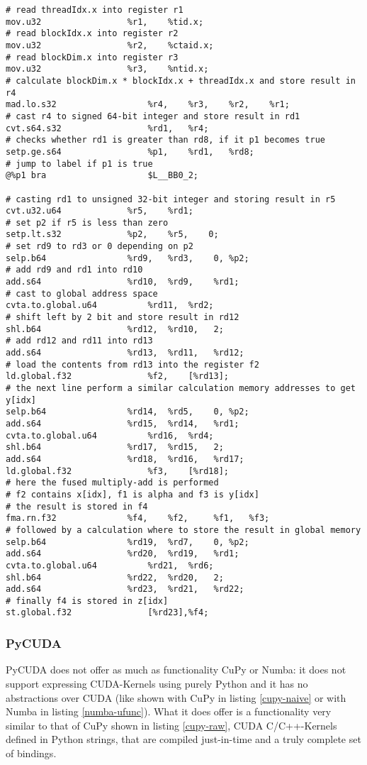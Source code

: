 \documentclass[english,11pt,a4paper,table]{article} %
\begin{document}
\begin{verbatim}
# read threadIdx.x into register r1
mov.u32					%r1, 	%tid.x;
# read blockIdx.x into register r2
mov.u32 				%r2, 	%ctaid.x;
# read blockDim.x into register r3
mov.u32					%r3, 	%ntid.x;
# calculate blockDim.x * blockIdx.x + threadIdx.x and store result in r4
mad.lo.s32     				%r4, 	%r3, 	%r2, 	%r1;
# cast r4 to signed 64-bit integer and store result in rd1
cvt.s64.s32     			%rd1, 	%r4;
# checks whether rd1 is greater than rd8, if it p1 becomes true
setp.ge.s64     			%p1, 	%rd1, 	%rd8;
# jump to label if p1 is true
@%p1 bra     				$L__BB0_2;

# casting rd1 to unsigned 32-bit integer and storing result in r5
cvt.u32.u64				%r5,	%rd1;
# set p2 if r5 is less than zero
setp.lt.s32				%p2,	%r5,	0;
# set rd9 to rd3 or 0 depending on p2
selp.b64				%rd9,	%rd3,	 0,	%p2;
# add rd9 and rd1 into rd10
add.s64					%rd10,	%rd9,	 %rd1;
# cast to global address space
cvta.to.global.u64			%rd11,	%rd2;
# shift left by 2 bit and store result in rd12
shl.b64					%rd12,	%rd10,	 2;
# add rd12 and rd11 into rd13
add.s64					%rd13,	%rd11,	 %rd12;
# load the contents from rd13 into the register f2
ld.global.f32				%f2,	[%rd13];
# the next line perform a similar calculation memory addresses to get y[idx]
selp.b64				%rd14,	%rd5,	 0,	%p2;
add.s64					%rd15,	%rd14,	 %rd1;
cvta.to.global.u64			%rd16,	%rd4;
shl.b64					%rd17,	%rd15,	 2;
add.s64					%rd18,	%rd16,	 %rd17;
ld.global.f32				%f3,	[%rd18];
# here the fused multiply-add is performed
# f2 contains x[idx], f1 is alpha and f3 is y[idx]
# the result is stored in f4
fma.rn.f32				%f4,	%f2,	 %f1, 	%f3;
# followed by a calculation where to store the result in global memory
selp.b64				%rd19,	%rd7,	 0,	%p2;
add.s64					%rd20,	%rd19,	 %rd1;
cvta.to.global.u64			%rd21,	%rd6;
shl.b64					%rd22,	%rd20,	 2;
add.s64					%rd23,	%rd21,	 %rd22;
# finally f4 is stored in z[idx]
st.global.f32				[%rd23],%f4;
\end{verbatim}

\subsubsection{PyCUDA}

PyCUDA does not offer as much as functionality CuPy or Numba: it does not support expressing CUDA-Kernels using purely Python and it has no abstractions over CUDA (like shown with CuPy in listing \ref{cupy-naive} or with Numba in listing \ref{numba-ufunc}).
What it does offer is a functionality very similar to that of CuPy shown in listing \ref{cupy-raw}, CUDA C/C++-Kernels defined in Python strings, that are compiled just-in-time and a truly complete set of bindings.
\end{document}
